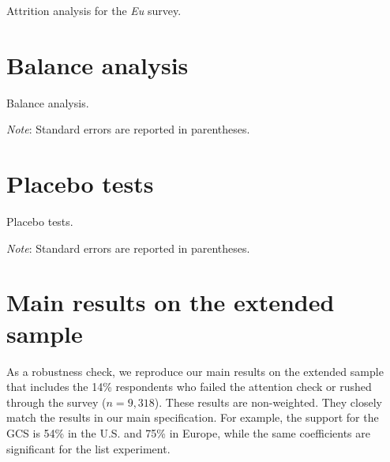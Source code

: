 \begin{table}[h]\label{tab:attrition_EU}
    \cprotect\caption[Attrition analysis: \textit{Eu}]{Attrition analysis for the \textit{Eu} survey.} 
    \makebox[\textwidth][c]{
\resizebox*{!}{.73\textheight}{ %
        
        }
    }
    {\footnotesize %
    }
\end{table}

\clearpage
\section{Balance analysis}\label{app:balance}

\begin{table}[h]\label{tab:balance}
    \cprotect\caption[Balance analysis]{Balance analysis.} 
    \makebox[\textwidth][c]{
\resizebox*{!}{.72\textheight}{ %
        
        }
    }
    {\footnotesize \textit{Note}: Standard errors are reported in parentheses.
    }
\end{table}
\clearpage

\section{Placebo tests}\label{app:placebo}

\begin{table}[h]\label{tab:placebo}
    \cprotect\caption[Placebo tests]{Placebo tests.} 
    \makebox[\textwidth][c]{
        
        }
    {\footnotesize \textit{Note}: Standard errors are reported in parentheses.
    }
\end{table}

\section{Main results on the extended sample}\label{app:extended}

As a robustness check, we reproduce our main results on the extended sample that includes the 14\% respondents who failed the attention check or rushed through the survey ($n = 9,318$). These results are non-weighted. They closely match the results in our main specification. For example, the support for the GCS is 54\% in the U.S. and 75\% in Europe, while the same coefficients are significant for the list experiment. %


